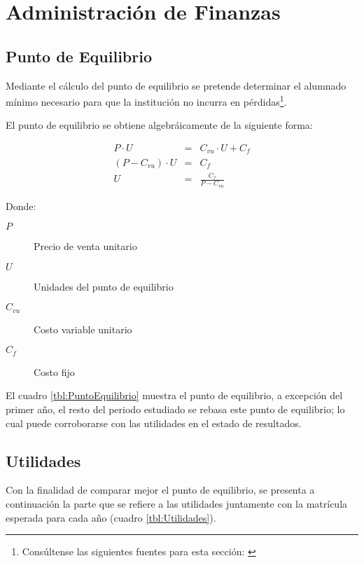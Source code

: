 \chapter{Administración de Finanzas}
\label{cap:Admin:Finanzas}

\section{Punto de Equilibrio}

Mediante el cálculo del punto de equilibrio se pretende determinar el alumnado mínimo necesario para que la institución no incurra en pérdidas\footnote{Consúltense las siguientes fuentes para esta sección: \citep{Van2003fundamentos, novoa2008finanzas, bodie2003finanzas}}.

El punto de equilibrio se obtiene algebráicamente de la siguiente forma:

$$
	\begin{array}{rcl}
		P \cdot U &=& C_{vu} \cdot U + C_f \\
		\left( P - C_{vu} \right) \cdot U &=& C_f \\
		U &=& \frac{C_f}{P - C_{vu}}
	\end{array}
$$

Donde:

\begin{description}
	\item[$P$] Precio de venta unitario
	\item[$U$] Unidades del punto de equilibrio
	\item[$C_{vu}$] Costo variable unitario
	\item[$C_f$] Costo fijo
\end{description}

El cuadro \ref{tbl:PuntoEquilibrio} muestra el punto de equilibrio, a excepción del primer año, el resto del periodo estudiado se rebasa este punto de equilibrio; lo cual puede corroborarse con las utilidades en el estado de resultados.



\section{Utilidades}

Con la finalidad de comparar mejor el punto de equilibrio, se presenta a continuación la parte que se refiere a las utilidades juntamente con la matrícula esperada para cada año (cuadro \ref{tbl:Utilidades}).

